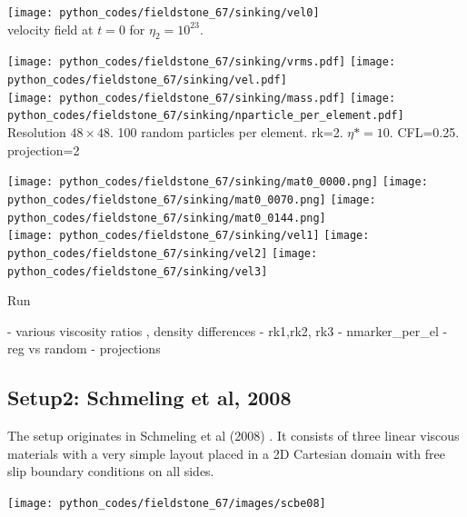 \begin{center}
\texttt{[image: python\_codes/fieldstone\_67/sinking/vel0]}\\
{\captionfont velocity field at $t=0$ for $\eta_2=10^{23}$.}
\end{center}

\begin{center}
\texttt{[image: python\_codes/fieldstone\_67/sinking/vrms.pdf]}
\texttt{[image: python\_codes/fieldstone\_67/sinking/vel.pdf]}\\
\texttt{[image: python\_codes/fieldstone\_67/sinking/mass.pdf]}
\texttt{[image: python\_codes/fieldstone\_67/sinking/nparticle\_per\_element.pdf]}\\
{\captionfont Resolution $48\times48$. 100 random particles per element. rk=2. $\eta*=10$. CFL=0.25. 
projection=2}
\end{center}


\begin{center}
\texttt{[image: python\_codes/fieldstone\_67/sinking/mat0\_0000.png]}
\texttt{[image: python\_codes/fieldstone\_67/sinking/mat0\_0070.png]}
\texttt{[image: python\_codes/fieldstone\_67/sinking/mat0\_0144.png]}\\
\texttt{[image: python\_codes/fieldstone\_67/sinking/vel1]}
\texttt{[image: python\_codes/fieldstone\_67/sinking/vel2]}
\texttt{[image: python\_codes/fieldstone\_67/sinking/vel3]}
\end{center}



Run 

- various viscosity ratios , density differences
- rk1,rk2, rk3
- nmarker\_per\_el
- reg vs random
- projections




\subsection*{Setup2: Schmeling et al, 2008}

The setup originates in Schmeling et al (2008) \cite{scbe08}. It consists of three linear viscous
materials with a very simple layout placed in a 2D Cartesian domain with free slip boundary conditions 
on all sides. 

\begin{center}
\texttt{[image: python\_codes/fieldstone\_67/images/scbe08]}
\end{center}

